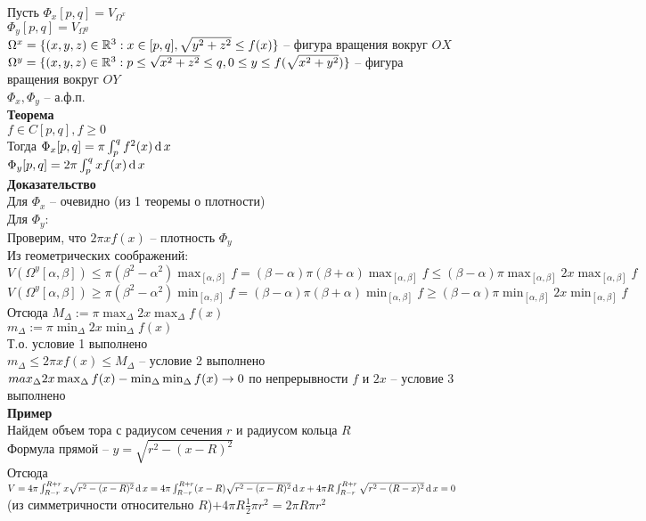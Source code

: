 \documentclass[12pt]{article}
\begin{document}
Пусть $\Phi_x[p,q] = V_{\Omega^x}$\\
$\Phi_y[p,q] = V_{\Omega^y}$\\
$\Omega^x = \{(x,y,z) \in \mathbb{R}^3: x \in [p,q], \sqrt{y^2+z^2} \leq f(x)\}$ -- фигура вращения вокруг $OX$\\
$\Omega^y = \{(x,y,z) \in \mathbb{R}^3: p \leq \sqrt{x^2+z^2} \leq q, 0 \leq y \leq f(\sqrt{x^2+y^2}) \}$ -- фигура вращения вокруг $OY$\\
$\Phi_x, \Phi_y$ -- а.ф.п.\\
\textbf{Теорема}\\
$f\in C[p,q], f \geq 0$\\
Тогда $\Phi_x[p,q] = \pi\int_p^q f^2(x)\operatorname{d} x$\\
$\Phi_y[p,q] = 2\pi\int_p^q xf(x)\operatorname{d} x$\\
\textbf{Доказательство}\\
Для $\Phi_x$ -- очевидно (из 1 теоремы о плотности)\\
Для $\Phi_y$:\\
Проверим, что $2\pi xf(x)$ -- плотность $\Phi_y$\\
Из геометрических соображений:\\
$V(\Omega^y[\alpha, \beta]) \leq \pi(\beta^2 - \alpha^2)\max_{[\alpha, \beta]}f = (\beta-\alpha)\pi (\beta+\alpha)\max_{[\alpha, \beta]} f \leq (\beta - \alpha) \pi \max_{[\alpha, \beta]} 2x \max_{[\alpha, \beta]} f$\\
$V(\Omega^y[\alpha, \beta]) \geq \pi(\beta^2 - \alpha^2)\min_{[\alpha, \beta]}f = (\beta-\alpha)\pi (\beta+\alpha)\min_{[\alpha, \beta]} f \geq (\beta - \alpha) \pi \min_{[\alpha, \beta]} 2x \min_{[\alpha, \beta]} f$\\
Отсюда $M_\Delta := \pi \max_\Delta 2x \max_\Delta f(x)$\\
$m_\Delta := \pi \min_\Delta 2x \min_\Delta f(x)$\\
Т.о. условие 1 выполнено\\
$m_\Delta \leq 2\pi x f(x) \leq M_\Delta$ -- условие 2 выполнено\\
$max_\Delta 2x \max_\Delta f(x) - \min_\Delta\min_\Delta f(x) \rightarrow 0$ по непрерывности $f$ и $2x$ -- условие 3 выполнено\\
\textbf{Пример}\\
Найдем объем тора с радиусом сечения $r$ и радиусом кольца $R$\\
Формула прямой -- $y = \sqrt{r^2 - (x-R)^2}$\\
Отсюда $V = 4\pi \int_{R-r}^{R+r} x\sqrt{r^2 - (x-R)^2} \operatorname{d} x = 4\pi \int_{R-r}^{R+r} (x-R)\sqrt{r^2-(x-R)^2}\operatorname{d} x + 4\pi R \int_{R-r}^{R+r} \sqrt{r^2-(R-x)^2}\operatorname{d} x = 0$(из симметричности относительно $R$)$ + 4\pi R\frac12 \pi r^2 = 2\pi R\pi r^2$\\
\end{document}
